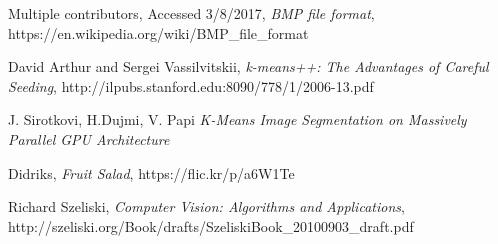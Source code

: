 \documentclass[11pt]{article}
\begin{document}
\begin{thebibliography}{9}

  Multiple contributors,
  Accessed 3/8/2017,
  \emph{BMP file format},
  https://en.wikipedia.org/wiki/BMP_file_format

  David Arthur and Sergei Vassilvitskii,
  \emph{k-means++: The Advantages of Careful Seeding},
  http://ilpubs.stanford.edu:8090/778/1/2006-13.pdf

  J. Sirotkovi, H.Dujmi, V. Papi
  \emph{K-Means Image Segmentation on Massively Parallel GPU Architecture}

  Didriks,
  \emph{Fruit Salad},
  https://flic.kr/p/a6W1Te

  Richard Szeliski,
  \emph{Computer Vision: Algorithms and Applications},
  http://szeliski.org/Book/drafts/SzeliskiBook_20100903_draft.pdf


\end{thebibliography}
\end{document}
